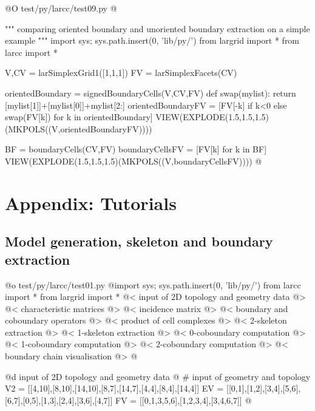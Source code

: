 \documentclass[11pt,oneside]{article}	%
\begin{document}
@O test/py/larcc/test09.py
@{""" comparing oriented boundary and unoriented boundary extraction on a simple example """
import sys; sys.path.insert(0, 'lib/py/')
from largrid import *
from larcc import *

V,CV = larSimplexGrid1([1,1,1])
FV = larSimplexFacets(CV)

orientedBoundary = signedBoundaryCells(V,CV,FV)
def swap(mylist): return [mylist[1]]+[mylist[0]]+mylist[2:]
orientedBoundaryFV = [FV[-k] if k<0 else swap(FV[k]) for k in orientedBoundary]
VIEW(EXPLODE(1.5,1.5,1.5)(MKPOLS((V,orientedBoundaryFV))))

BF = boundaryCells(CV,FV)
boundaryCellsFV = [FV[k] for k in BF]
VIEW(EXPLODE(1.5,1.5,1.5)(MKPOLS((V,boundaryCellsFV))))
@}



\appendix

\section{Appendix: Tutorials}


\subsection{Model generation, skeleton and boundary extraction}

@o test/py/larcc/test01.py
@{import sys; sys.path.insert(0, 'lib/py/')
from larcc import *
from largrid import *
@< input of 2D topology and geometry data @>
@< characteristic matrices @>
@< incidence matrix @>
@< boundary and coboundary operators @>
@< product of cell complexes @>
@< 2-skeleton extraction @>
@< 1-skeleton extraction  @>
@< 0-coboundary computation @>
@< 1-coboundary computation @>
@< 2-coboundary computation @>
@< boundary chain visualisation @>
@}

@d input of 2D topology and geometry data
@{
# input of geometry and topology  
V2 = [[4,10],[8,10],[14,10],[8,7],[14,7],[4,4],[8,4],[14,4]]
EV = [[0,1],[1,2],[3,4],[5,6],[6,7],[0,5],[1,3],[2,4],[3,6],[4,7]]
FV = [[0,1,3,5,6],[1,2,3,4],[3,4,6,7]]
@}
\end{document}
